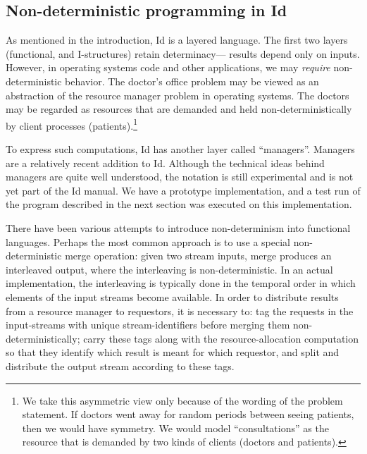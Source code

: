  \begin{figure}[htbp]
 \end{figure}

\subsection{Non-deterministic programming in Id}

As mentioned in the introduction, Id is a layered language. The first
two layers (functional, and I-structures) retain determinacy---
results depend only on inputs.  However, in operating systems code and
other applications, we may {\em require\/} non-deterministic behavior.
The doctor's office problem may be viewed as an abstraction of the
resource manager problem in operating systems.  The doctors may be
regarded as resources that are demanded and held non-deterministically
by client processes (patients).\footnote{We take this asymmetric view
only because of the wording of the problem statement.  If doctors went
away for random periods between seeing patients, then we would have
symmetry.  We would model ``consultations'' as the resource that is
demanded by two kinds of clients (doctors and patients).}

To express such computations, Id has another layer called
``managers''.  Managers are a relatively recent addition to Id.
Although the technical ideas behind managers are quite well
understood, the notation is still experimental and is not yet part of
the Id manual.  We have a prototype implementation, and a test run of
the program described in the next section was executed on this
implementation.

There have been various attempts to introduce non-determinism into
functional languages.  Perhaps the most common approach is to use a
special non-deterministic {\cf merge} operation: given two stream
inputs, {\cf merge} produces an interleaved output, where the
interleaving is non-deterministic.  In an actual implementation, the
interleaving is typically done in the temporal order in which elements
of the input streams become available.  In order to distribute results
from a resource manager to requestors, it is necessary to: tag the
requests in the input-streams with unique stream-identifiers before
merging them non-deterministically; carry these tags along with the
resource-allocation computation so that they identify which result is
meant for which requestor, and split and distribute the output stream
according to these tags.

